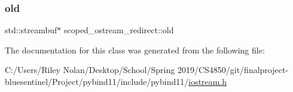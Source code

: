 \mbox{\label{classscoped__ostream__redirect_a519992f77b1bfc432f151b2a890a85cf}} 
\subsubsection{\texorpdfstring{old}{old}}
{\footnotesize\ttfamily std\+::streambuf$\ast$ scoped\+\_\+ostream\+\_\+redirect\+::old\hspace{0.3cm}{\ttfamily [protected]}}



The documentation for this class was generated from the following file\+:\begin{DoxyCompactItemize}
\item 
C\+:/\+Users/\+Riley Nolan/\+Desktop/\+School/\+Spring 2019/\+C\+S4850/git/finalproject-\/bluesentinel/\+Project/pybind11/include/pybind11/\mbox{\hyperlink{iostream_8h}{iostream.\+h}}\end{DoxyCompactItemize}
